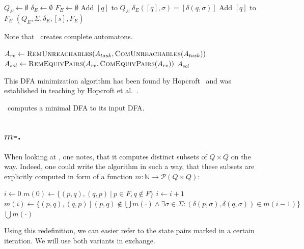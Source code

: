 \begin{enumerate}
	\vspace{0.2cm}
	\begin{algorithmic}[1] \label{ch:1:minmerge}
		 
            \State $Q_E \gets \emptyset$
            \State $\delta_E \gets \emptyset$
            \State $F_E \gets \emptyset$
                \State Add $[q]$ to $Q_E$
                    \State $\delta_E([q], \sigma) = [\delta(q, \sigma)]$
                \EndFor
                    \State Add $[q]$ to $F_E$
                \EndIf
            \EndFor
			\State \Return $(Q_E, \Sigma, \delta_E, [s], F_E)$
		\EndFunction
	\end{algorithmic}
	Note that \RemEq\ creates complete automatons.
\end{enumerate}

\vspace{0.2cm}
\begin{algorithmic}[1] \label{ch:1:minalg}
    \State $A_{re} \gets \textsc{RemUnreachables}(A_{task}, \textsc{ComUnreachables}(A_{task}))$
    \State $A_{sol} \gets \textsc{RemEquivPairs}(A_{re}, \textsc{ComEquivPairs}(A_{re}))$
    \State \Return $A_{sol}$
    \EndFunction
\end{algorithmic}
\vspace{0.2cm}
\noindent This DFA minimization algorithm has been found by Hopcroft~\cite{Hop71} and was established in teaching by Hopcroft et al.~\cite[pp. 154-164]{HMU01}.

\begin{theorem}\label{ch:1:min-alg-correct}\textnormal{\cite[pp. 162-164]{HMU01}}
	\MinAlg\ computes a minimal DFA to its input DFA.
\end{theorem}

\subsection{$m$-\CompDist.}

When looking at \CompDist, one notes, that it computes distinct subsets of $Q \times Q$ on the way. Indeed, one could write the algorithm in such a way, that these subsets are explicitly computed in form of a function $m\colon\mathbb{N}\to\mathcal{P}(Q\times Q)$:
\vspace{0.2cm}
\begin{algorithmic}[1] \label{ch:1:m-minmark}
	\State $i \gets 0$
	\State $m(0) \gets \{ (p,q), (q,p)\ |\ p \in F, q \notin F \}$
	\Do
		\State $i \gets i + 1$
		\State $m(i) \gets \{ (p,q), (q,p)\ |\ (p,q) \notin \bigcup{m(\cdot)} \land \exists \sigma \in \Sigma \colon (\delta(p,\sigma), \delta(q,\sigma)) \in m(i-1) \}$
	\State \Return $\bigcup{m(\cdot)}$
	\EndFunction
\end{algorithmic}
\vspace{0.2cm}
Using this redefinition, we can easier refer to the state pairs marked in a certain iteration. We will use both variants in exchange.

